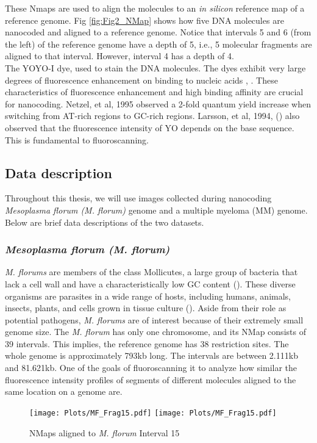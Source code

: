 These Nmaps are used to align the molecules to an {\emph{in silicon}} reference map of a reference genome. Fig \ref{fig:Fig2_NMap} shows how five DNA molecules are nanocoded and aligned to a reference genome. Notice that intervals 5 and 6 (from the left) of the reference genome have a depth of 5, i.e., 5 molecular fragments are aligned to that interval. However, interval 4 has a depth of 4. \\

The YOYO-I dye, used to stain the DNA molecules. The dyes exhibit very large degrees of fluorescence enhancement on binding to nucleic acids \cite{Rye_etal_1992_NAR}, \cite{Lee_etal_1986_Cytometry}. These characteristics of fluorescence enhancement and high binding affinity are crucial for nanocoding. Netzel, et al, 1995 \cite{Netzel_etal_1995_JPC} observed a 2-fold quantum yield increase when switching from AT-rich regions to GC-rich regions. Larsson, et al, 1994, (\cite{Larsson_etal_1994_JACS}) also observed that the fluorescence intensity of YO depends on the base sequence. This is fundamental to fluoroscanning.  

\subsection{Data description} \label{Ch2_data}
Throughout this thesis, we will use images collected during nanocoding {\emph{Mesoplasma florum (M. florum)}} genome and a multiple myeloma (MM) genome. Below are brief data descriptions of the two datasets.
\subsubsection{\emph{Mesoplasma florum (M. florum)}}
{\emph{M. florums}} are members of the class Mollicutes, a large group of bacteria that lack a cell wall and have a characteristically low GC content (\cite{Razin_etal_1998_MMBR}). These diverse organisms are parasites in a wide range of hosts, including humans, animals, insects, plants, and cells grown in tissue culture (\cite{Razin_etal_1998_MMBR}). Aside from their role as potential pathogens, {\emph{M. florums}} are of interest because of their extremely small genome size. The {\emph{M. florum}} has only one chromosome, and its NMap consists of 39 intervals. This implies, the reference genome has 38 restriction sites. The whole genome is approximately 793kb long. The intervals are between 2.111kb and 81.621kb. One of the goals of fluoroscanning it to analyze how similar the fluorescence intensity profiles of segments of different molecules aligned to the same location on a genome are. 
\begin{figure}[H]
\begin{center}
\texttt{[image: Plots/MF\_Frag15.pdf]}
\texttt{[image: Plots/MF\_Frag15.pdf]}
\end{center}
\caption{NMaps aligned to {\emph{M. florum}} Interval 15}
\label{fig:Fig2_MF_Frag15}
\end{figure}


